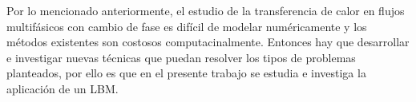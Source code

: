 Por lo mencionado anteriormente, el estudio de la transferencia de calor en flujos multifásicos con cambio de fase es difícil de modelar numéricamente y los métodos existentes son costosos computacinalmente. Entonces hay que desarrollar e investigar nuevas técnicas que puedan resolver los tipos de problemas planteados, por ello es que en el presente trabajo se estudia e investiga la aplicación de un LBM. 

%
%
%
%
%
%
%
%
